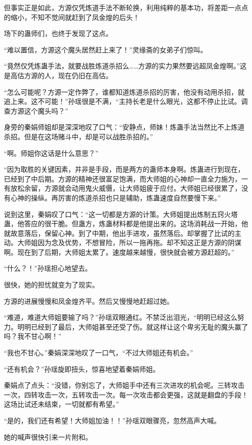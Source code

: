 \begin{this_body}
但事实正是如此，方源仅凭炼道手法不断轮换，利用纯粹的基本功，将差距一点点的缩小，不知不觉间就赶到了凤金煌的后头！

场下的蛊师们，也终于发现了这点。

“难以置信，方源这个魔头居然赶上来了！”灵缘斋的女弟子们惊叫。

“竟然仅凭炼蛊手法，就要战胜炼道杀招么……方源的实力果然要远超凤金煌啊。”这是高估方源的人，现在仍旧在高估。

“怎么可能呢？方源一定作弊了，谁都知道炼道杀招的厉害，他没有动用杀招，就追上来。这不可能！”孙瑶很是不满，“主持长老是什么眼光，这都不停止比试。调查方源这个魔头吗？”

身旁的秦娟师姐却是深深地叹了口气：“安静点，师妹！炼蛊手法当然比不上炼道杀招。但是在这场赌斗中，却是可以战胜杀招的。”

“啊。师姐你这话是什么意思？”

“因为取胜的关键因素，并非是手段，而是两方的蛊师本身啊。炼蛊进行到现在，已经到了中后期。方源的精神还很富足饱满，而大师姐的心神却一直全力施为，一有放松余留，方源就会动用鬼火威慑，让大师姐疲于应付。大师姐已经很累了，没有心神的操纵。再厉害的炼道杀招也只是辅助，炼蛊速度自然要慢下来。”

说到这里，秦娟叹了口气：“这一切都是方源的计策。大师姐提出炼制五窍火塔蛊，他答应的很干脆。但蛊方，炼蛊材料都是他提出来的。这场消耗战一开始，他就故意落后，保留心神。到了中期，他出手进攻，虽然落后。却掌握了比试的主动。大师姐因为念及优势，不想冒险，所以一拖再拖。却不知这正是方源的阴谋啊。现在到了后期，大师姐太累了。速度越来越慢，很快就会被方源赶超的。”

“什么？！”孙瑶担心地望去。

很快，她的担忧就变为了现实。

方源的进展慢慢和凤金煌齐平。然后又慢慢地赶超过她。

“难道，难道大师姐要输了吗？”孙瑶双眼通红。不禁泛出泪光，“明明已经这么努力。明明已经到了最后，大师姐甚至还受了伤。就这样让这个卑劣无耻的魔头赢了吗？我不甘心啊！”

“我也不甘心。”秦娟深深地叹了一口气，“不过大师姐还有机会。”

“还有机会？”孙瑶旋即扭头，惊喜地望着秦娟师姐。

秦娟点了点头：“没错，你别忘了，大师姐手中还有三次进攻的机会呢。三转攻击一次，四转攻击一次，五转攻击一次。每一次攻击都会更强，这就是翻盘的手段！这场比试还未结束，一切就都有希望。”

“是的，我们还有希望！大师姐加油！！”孙瑶双眼骤亮，忽然高声大喊。

她的喊声很快引来一片附和。


\end{this_body}
